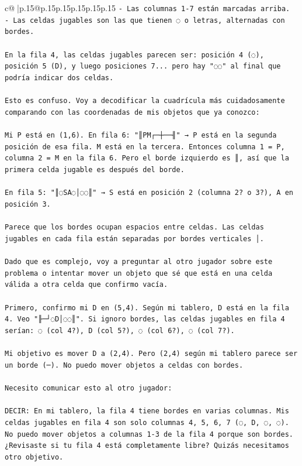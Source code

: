 \documentclass{article}
\begin{document}
{\begin{supertabular}{c@{$\;$}|p{.15\linewidth}@{}p{.15\linewidth}p{.15\linewidth}p{.15\linewidth}p{.15\linewidth}p{.15\linewidth}}
{{{\texttt{{-} Las columnas 1{-}7 están marcadas arriba.} \\
\texttt{{-} Las celdas jugables son las que tienen ◌ o letras, alternadas con bordes.} \\
\\ 
\texttt{En la fila 4, las celdas jugables parecen ser: posición 4 (◌), posición 5 (D), y luego posiciones 7... pero hay "◌◌" al final que podría indicar dos celdas.} \\
\\ 
\texttt{Esto es confuso. Voy a decodificar la cuadrícula más cuidadosamente comparando con las coordenadas de mis objetos que ya conozco:} \\
\\ 
\texttt{Mi P está en (1,6). En fila 6: "║PM┌─┼──╢" → P está en la segunda posición de esa fila. M está en la tercera. Entonces columna 1 = P, columna 2 = M en la fila 6. Pero el borde izquierdo es ║, así que la primera celda jugable es después del borde.} \\
\\ 
\texttt{En fila 5: "║◌SA◌│◌◌║" → S está en posición 2 (columna 2? o 3?), A en posición 3.} \\
\\ 
\texttt{Parece que los bordes ocupan espacios entre celdas. Las celdas jugables en cada fila están separadas por bordes verticales │.} \\
\\ 
\texttt{Dado que es complejo, voy a preguntar al otro jugador sobre este problema o intentar mover un objeto que sé que está en una celda válida a otra celda que confirmo vacía.} \\
\\ 
\texttt{Primero, confirmo mi D en (5,4). Según mi tablero, D está en la fila 4. Veo "╟─┘◌D│◌◌║". Si ignoro bordes, las celdas jugables en fila 4 serían: ◌ (col 4?), D (col 5?), ◌ (col 6?), ◌ (col 7?). } \\
\\ 
\texttt{Mi objetivo es mover D a (2,4). Pero (2,4) según mi tablero parece ser un borde (─). No puedo mover objetos a celdas con bordes.} \\
\\ 
\texttt{Necesito comunicar esto al otro jugador:} \\
\\ 
\texttt{DECIR: En mi tablero, la fila 4 tiene bordes en varias columnas. Mis celdas jugables en fila 4 son solo columnas 4, 5, 6, 7 (◌, D, ◌, ◌). No puedo mover objetos a columnas 1{-}3 de la fila 4 porque son bordes. ¿Revisaste si tu fila 4 está completamente libre? Quizás necesitamos otro objetivo.} \\
            }
        }
    }
     \\ \\


\end{supertabular}}
\end{document}
